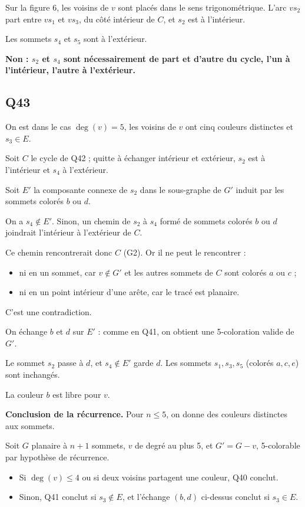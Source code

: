 \documentclass[11pt,a4paper]{article}
\providecommand{\tightlist}{\setlength{\itemsep}{0pt}\setlength{\parskip}{0pt}}
\newcommand{\equationajustee}[1]{%
  \sbox{\boiteequation}{$\displaystyle #1$}%
  \ifdim\wd\boiteequation>\linewidth
    \[\resizebox{\linewidth}{!}{\usebox{\boiteequation}}\]%
  \else
    \[#1\]%
  \fi}
\begin{document}
Sur la figure 6, les voisins de \(v\) sont placés dans le sens trigonométrique. L'arc \(vs_2\) part entre \(vs_1\) et \(vs_3\), du côté intérieur de \(C\), et \(s_2\) est à l'intérieur.

Les sommets \(s_4\) et \(s_5\) sont à l'extérieur.

\textbf{Non : \(s_2\) et \(s_4\) sont nécessairement de part et d'autre du cycle, l'un à l'intérieur, l'autre à l'extérieur.}

\hypertarget{q43}{%
\subsection{Q43}\label{q43}}

On est dans le cas \(\deg(v) = 5\), les voisins de \(v\) ont cinq couleurs distinctes et \(s_3 \in E\).

Soit \(C\) le cycle de Q42 ; quitte à échanger intérieur et extérieur, \(s_2\) est à l'intérieur et \(s_4\) à l'extérieur.

Soit \(E'\) la composante connexe de \(s_2\) dans le sous-graphe de \(G'\) induit par les sommets colorés \(b\) ou \(d\).

On a \(s_4 \notin E'\). Sinon, un chemin de \(s_2\) à \(s_4\) formé de sommets colorés \(b\) ou \(d\) joindrait l'intérieur à l'extérieur de \(C\).

Ce chemin rencontrerait donc \(C\) (G2). Or il ne peut le rencontrer :

\begin{itemize}
\tightlist
\item
  ni en un sommet, car \(v \notin G'\) et les autres sommets de \(C\) sont colorés \(a\) ou \(c\) ;
\item
  ni en un point intérieur d'une arête, car le tracé est planaire.
\end{itemize}

C'est une contradiction.

On échange \(b\) et \(d\) sur \(E'\) : comme en Q41, on obtient une 5-coloration valide de \(G'\).

Le sommet \(s_2\) passe à \(d\), et \(s_4 \notin E'\) garde \(d\). Les sommets \(s_1, s_3, s_5\) (colorés \(a, c, e\)) sont inchangés.

La couleur \(b\) est libre pour \(v\).

\textbf{Conclusion de la récurrence.} Pour \(n \le 5\), on donne des couleurs distinctes aux sommets.

Soit \(G\) planaire à \(n + 1\) sommets, \(v\) de degré au plus 5, et \(G' = G - v\), 5-colorable par hypothèse de récurrence.

\begin{itemize}
\tightlist
\item
  Si \(\deg(v) \le 4\) ou si deux voisins partagent une couleur, Q40 conclut.
\item
  Sinon, Q41 conclut si \(s_3 \notin E\), et l'échange \((b, d)\) ci-dessus conclut si \(s_3 \in E\).
\end{itemize}

\equationajustee{\boxed{\,\text{Tout graphe planaire est 5-colorable.}\,}}
\end{document}
